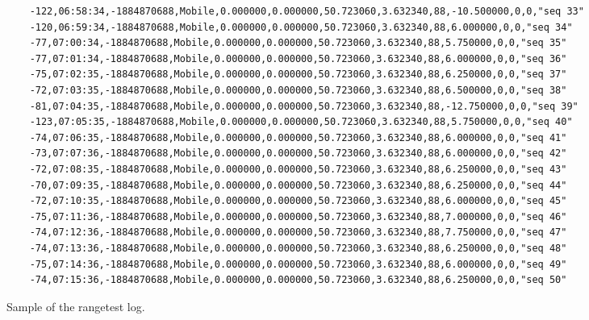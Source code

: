 \begin{listing}[H]
\begin{verbatim}
    -122,06:58:34,-1884870688,Mobile,0.000000,0.000000,50.723060,3.632340,88,-10.500000,0,0,"seq 33"
    -120,06:59:34,-1884870688,Mobile,0.000000,0.000000,50.723060,3.632340,88,6.000000,0,0,"seq 34"
    -77,07:00:34,-1884870688,Mobile,0.000000,0.000000,50.723060,3.632340,88,5.750000,0,0,"seq 35"
    -77,07:01:34,-1884870688,Mobile,0.000000,0.000000,50.723060,3.632340,88,6.000000,0,0,"seq 36"
    -75,07:02:35,-1884870688,Mobile,0.000000,0.000000,50.723060,3.632340,88,6.250000,0,0,"seq 37"
    -72,07:03:35,-1884870688,Mobile,0.000000,0.000000,50.723060,3.632340,88,6.500000,0,0,"seq 38"
    -81,07:04:35,-1884870688,Mobile,0.000000,0.000000,50.723060,3.632340,88,-12.750000,0,0,"seq 39"
    -123,07:05:35,-1884870688,Mobile,0.000000,0.000000,50.723060,3.632340,88,5.750000,0,0,"seq 40"
    -74,07:06:35,-1884870688,Mobile,0.000000,0.000000,50.723060,3.632340,88,6.000000,0,0,"seq 41"
    -73,07:07:36,-1884870688,Mobile,0.000000,0.000000,50.723060,3.632340,88,6.000000,0,0,"seq 42"
    -72,07:08:35,-1884870688,Mobile,0.000000,0.000000,50.723060,3.632340,88,6.250000,0,0,"seq 43"
    -70,07:09:35,-1884870688,Mobile,0.000000,0.000000,50.723060,3.632340,88,6.250000,0,0,"seq 44"
    -72,07:10:35,-1884870688,Mobile,0.000000,0.000000,50.723060,3.632340,88,6.000000,0,0,"seq 45"
    -75,07:11:36,-1884870688,Mobile,0.000000,0.000000,50.723060,3.632340,88,7.000000,0,0,"seq 46"
    -74,07:12:36,-1884870688,Mobile,0.000000,0.000000,50.723060,3.632340,88,7.750000,0,0,"seq 47"
    -74,07:13:36,-1884870688,Mobile,0.000000,0.000000,50.723060,3.632340,88,6.250000,0,0,"seq 48"
    -75,07:14:36,-1884870688,Mobile,0.000000,0.000000,50.723060,3.632340,88,6.000000,0,0,"seq 49"
    -74,07:15:36,-1884870688,Mobile,0.000000,0.000000,50.723060,3.632340,88,6.250000,0,0,"seq 50"
  \end{verbatim}
  \caption[Rangetest log]{Sample of the rangetest log.}
\end{listing}